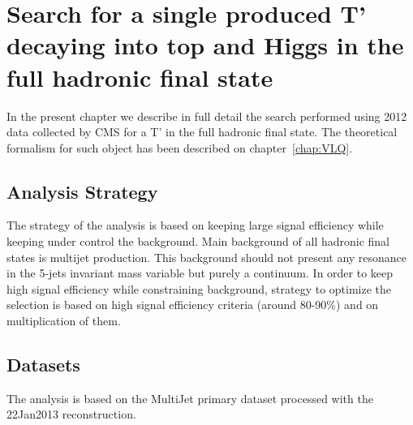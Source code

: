 \chapter[Single VLQ search]{Search for a single produced T' decaying into top and Higgs in the full hadronic final state}
\label{chap:search}

In the present chapter we describe in full detail the search performed using 2012 data collected by CMS for a T' in the full hadronic final state. The theoretical formalism for such object has been described on chapter~\ref{chap:VLQ}.

\section{Analysis Strategy}
\label{sec:stra}

The strategy of the analysis is based on keeping large signal efficiency while keeping under control the background. Main background of all hadronic final states is multijet production. This background should not present any resonance in the 5-jets invariant mass variable but purely a continuum. In order to keep high signal efficiency while constraining background, strategy to optimize the selection is based on high signal efficiency criteria (around 80-90\%) and on multiplication of them. 

\section{Datasets}
\label{sec:data}

The analysis is based on the MultiJet primary dataset processed with the 22Jan2013 reconstruction.

\begin{table}[htbH]
\begin{center}
\caption{List of Multijet Primary Dataset used in the analysis and the corresponding integrated luminosity calculating using the golden JSON\label{tab:datasets}}
\end{center}
\end{table}\clearpage

